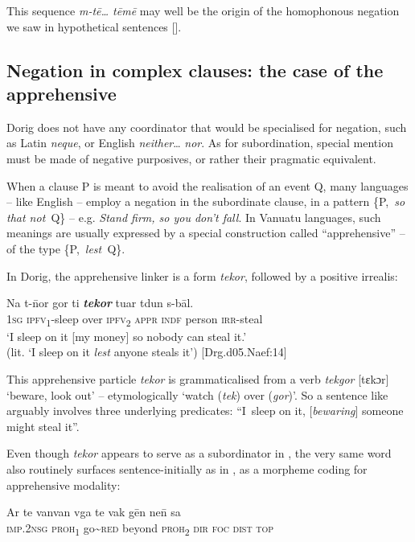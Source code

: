 \documentclass[output=paper,colorlinks,citecolor=brown,draft]{langscibook}
\begin{document}
This sequence \textit{m-tē… tēmē} may well be the origin of the homophonous negation we saw in hypothetical sentences [].

\subsection{Negation in complex clauses: the case of the apprehensive}\label{sec:dor:4.5}

Dorig does not have any coordinator that would be specialised for negation, such as Latin \textit{neque}, or English \textit{neither}… \textit{nor}. As for subordination, special mention must be made of negative purposives, or rather their pragmatic equivalent. 

When a clause P is meant to avoid the realisation of an event Q, many languages – like English – employ a negation in the subordinate clause, in a pattern \{P,~\textit{so that not~}Q\} – e.g. \textit{Stand firm, so you don’t fall}. In Vanuatu languages, such meanings are usually expressed by a special construction called “apprehensive” – of the type \{P,~\textit{lest~}Q\}. 

In Dorig, the apprehensive linker is a form \textit{tekor}, followed by a positive irrealis:

\ea\label{ex:dor:steal} 
    \gll   Na t-\={n}or gor ti \textbf{\textit{tekor}} tuar tdun s-bāl.\\ 
          \textsc{1sg} \textsc{ipfv\textsubscript{1}}-sleep over \textsc{ipfv\textsubscript{2}} \textsc{appr} \textsc{indf} person \textsc{irr}-steal\\
    \glt ‘I sleep on it [my money] so nobody can steal it.’ \\(lit. ‘I sleep on it \textit{lest} anyone steals it’)  {\small [Drg.d05.Naef:14]}
\z 

\noindent This apprehensive particle \textit{tekor} is grammaticalised from a verb \textit{tekgor} [tɛkɔr] ‘beware, look out’ – etymologically ‘watch (\textit{tek}) over (\textit{gor})’. So a sentence like  arguably involves three underlying predicates: “I~sleep on it, [\textit{bewaring}] someone might steal it”.

Even though \textit{tekor} appears to serve as a subordinator in , the very same word also routinely surfaces sentence-initially as in , as a morpheme coding for apprehensive modality:

\ea\label{ex:dor:ghost} 
    \gll   Ar te vanvan vga te vak gēn ne\={n} sa \\
     \textsc{imp.2nsg} \textsc{proh\textsubscript{1}} go{\textasciitilde}\textsc{red} beyond \textsc{proh\textsubscript{2}} \textsc{dir} \textsc{foc} \textsc{dist} \textsc{top} \\
\end{document}
